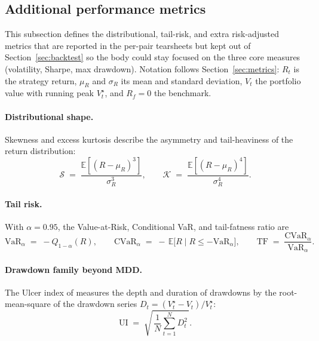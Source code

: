 \subsection{Additional performance metrics}\label{sec:apx-extra-metrics}

This subsection defines the distributional, tail-risk, and extra risk-adjusted metrics that are reported in the per-pair tearsheets but kept out of Section~\ref{sec:backtest} so the body could stay focused on the three core measures (volatility, Sharpe, max drawdown). Notation follows Section~\ref{sec:metrics}: $R_t$ is the strategy return, $\mu_R$ and $\sigma_R$ its mean and standard deviation, $V_t$ the portfolio value with running peak $V_t^{\star}$, and $R_f = 0$ the benchmark.

\paragraph{Distributional shape.} Skewness and excess kurtosis describe the asymmetry and tail-heaviness of the return distribution:
\begin{equation}\label{eq:distshape}
    \mathcal{S} \;=\; \frac{\mathbb{E}[(R-\mu_R)^{3}]}{\sigma_R^{3}},
    \qquad
    \mathcal{K} \;=\; \frac{\mathbb{E}[(R-\mu_R)^{4}]}{\sigma_R^{4}}.
\end{equation}

\paragraph{Tail risk.} With $\alpha = 0.95$, the Value-at-Risk, Conditional VaR, and tail-fatness ratio are \parencite{artzner1999coherent}
\begin{equation}\label{eq:varcvar}
    \mathrm{VaR}_\alpha \;=\; -Q_{1-\alpha}(R),
    \qquad
    \mathrm{CVaR}_\alpha \;=\; -\,\mathbb{E}\bigl[R \mid R \leq -\mathrm{VaR}_\alpha\bigr],
    \qquad
    \mathrm{TF} \;=\; \frac{\mathrm{CVaR}_\alpha}{\mathrm{VaR}_\alpha}.
\end{equation}

\paragraph{Drawdown family beyond MDD.} The Ulcer index of \textcite{martin1989ulcer} measures the depth and duration of drawdowns by the root-mean-square of the drawdown series $D_t = (V_t^{\star} - V_t)/V_t^{\star}$:
\begin{equation}\label{eq:ulcer}
    \mathrm{UI} \;=\; \sqrt{\,\frac{1}{N}\sum_{t=1}^{N} D_t^{2}\,}.
\end{equation}

